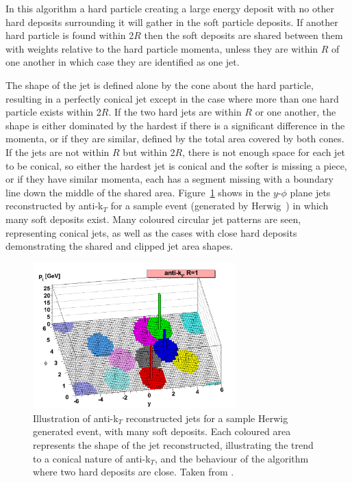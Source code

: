 In this algorithm a hard particle creating a large energy deposit with no other hard deposits surrounding it will gather in the soft particle deposits. If another hard particle is found within 2$R$ then the soft deposits are shared between them with weights relative to the hard particle momenta, unless they are within $R$ of one another in which case they are identified as one jet. 

The shape of the jet is defined alone by the cone about the hard particle, resulting in a perfectly conical jet except in the case where more than one hard particle exists within 2$R$. If the two hard jets are within $R$ or one another, the shape is either dominated by the hardest if there is a significant difference in the momenta, or if they are similar, defined by the total area covered by both cones. If the jets are not within $R$ but within 2$R$, there is not enough space for each jet to be conical, so either the hardest jet is conical and the softer is missing a piece, or if they have similar momenta, each has a segment missing with a boundary line down the middle of the shared area. Figure~\ref{fig:akt} shows in the $y$-$\phi$ plane jets reconstructed by anti-k$_{T}$ for a sample event (generated by Herwig~\cite{HERWIG}) in which many soft deposits exist. Many coloured circular jet patterns are seen, representing conical jets, as well as the cases with close hard deposits demonstrating the shared and clipped jet area shapes. 

\begin{figure}
\centering
\includegraphics[width=0.7\textwidth]{Figures/Objects/akt}
\caption[Illustration of anti-k$_{T}$ reconstructed jets for a sample Herwig generated event, with many soft deposits.]{\label{fig:akt}Illustration of anti-k$_{T}$ reconstructed jets for a sample Herwig generated event, with many soft deposits. Each coloured area represents the shape of the jet reconstructed, illustrating the trend to a conical nature of anti-k$_{T}$, and the behaviour of the algorithm where two hard deposits are close. Taken from \cite{akt}.}
\end{figure}

